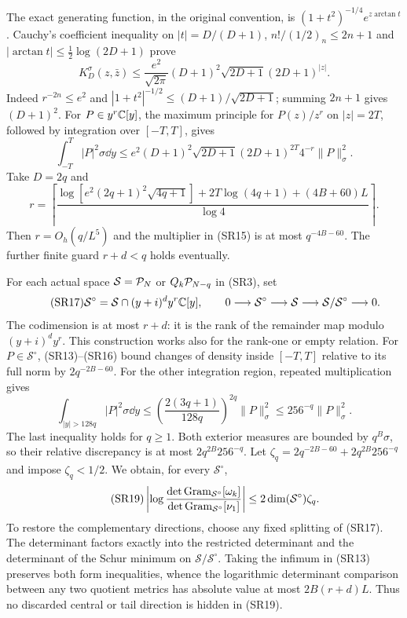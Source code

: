 \documentclass[11pt,a4paper]{article}
\begin{document}
The exact generating function, in the original convention, is
$(1+t^2)^{-1/4}e^{z\arctan t}$ \cite{a02sr:DLMF}. Cauchy's coefficient inequality
on $|t|=D/(D+1)$, $n!/(1/2)_n\le2n+1$ and
$|\arctan t|\le\frac12\log(2D+1)$ prove
\begin{equation}\tag{SR14}
 K_D^\sigma(z,\bar z)
 \le\frac{e^2}{\sqrt{2\pi}}(D+1)^2\sqrt{2D+1}(2D+1)^{|z|}.
\end{equation}
Indeed $r^{-2n}\le e^2$ and
$|1+t^2|^{-1/2}\le(D+1)/\sqrt{2D+1}$; summing $2n+1$ gives
$(D+1)^2$. For $P\in y^r\mathbb C[y]$, the maximum principle for $P(z)/z^r$
on $|z|=2T$, followed by integration over $[-T,T]$, gives
\begin{equation}\tag{SR15}
 \int_{-T}^T|P|^2\sigma\dd y
 \le e^2(D+1)^2\sqrt{2D+1}(2D+1)^{2T}4^{-r}\|P\|_\sigma^2.
\end{equation}
Take $D=2q$ and
\begin{equation}\tag{SR16}
 r=\left\lceil\frac{
 \log[e^2(2q+1)^2\sqrt{4q+1}]+2T\log(4q+1)+(4B+60)L}
 {\log4}\right\rceil.
\end{equation}
Then $r=O_h(q/L^5)$ and the multiplier in (SR15) is at most $q^{-4B-60}$.
The further finite guard $r+d<q$ holds eventually.

For each actual space $\mathcal S=\mathcal P_N$ or $Q_k\mathcal P_{N-q}$ in (SR3), set
\begin{equation}\tag{SR17}
 \mathcal S^\circ=\mathcal S\cap(y+i)^d y^r\mathbb C[y],\qquad
 0\longrightarrow\mathcal S^\circ\longrightarrow\mathcal S
 \longrightarrow\mathcal S/\mathcal S^\circ\longrightarrow0.
\end{equation}
The codimension is at most $r+d$: it is the rank of the remainder map modulo
$(y+i)^dy^r$. This construction works also for the rank-one or empty relation.
For $P\in\mathcal S^\circ$, (SR13)--(SR16) bound changes of density inside
$[-T,T]$ relative to its full norm by $2q^{-2B-60}$.
For the other integration region, repeated multiplication gives
\begin{equation}\tag{SR18}
 \int_{|y|>128q}|P|^2\sigma\dd y
 \le\left(\frac{2(3q+1)}{128q}\right)^{2q}\|P\|_\sigma^2
 \le256^{-q}\|P\|_\sigma^2.
\end{equation}
The last inequality holds for $q\ge1$. Both exterior measures are bounded
by $q^B\sigma$, so their relative discrepancy is at most $2q^{2B}256^{-q}$.
Let $\zeta_q=2q^{-2B-60}+2q^{2B}256^{-q}$ and impose $\zeta_q<1/2$.
We obtain, for every $\mathcal S^\circ$,
\begin{equation}\tag{SR19}
 \left|\log\frac{\det\operatorname{Gram}_{\mathcal S^\circ}[\omega_k]}
 {\det\operatorname{Gram}_{\mathcal S^\circ}[\nu_1]}\right|
 \le2\dim(\mathcal S^\circ)\zeta_q.
\end{equation}
To restore the complementary directions, choose any fixed splitting of
(SR17). The determinant factors exactly into the restricted determinant and
the determinant of the Schur minimum on $\mathcal S/\mathcal S^\circ$.
Taking the infimum in (SR13) preserves both form inequalities, whence the
logarithmic determinant comparison between any two quotient metrics has
absolute value at most $2B(r+d)L$. Thus no discarded central or tail direction
is hidden in (SR19).
\end{document}

